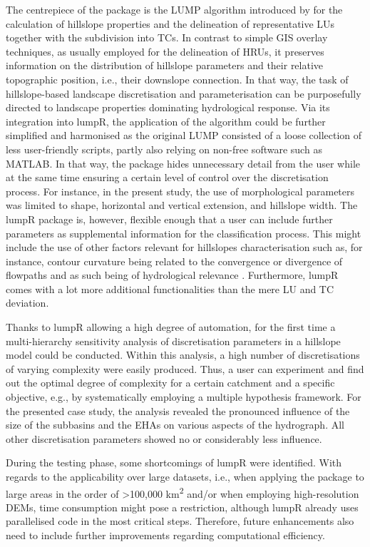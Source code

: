 The centrepiece of the package is the LUMP algorithm introduced by \citet{Francke2008} for the calculation of hillslope properties and the delineation of representative LUs together with the subdivision into TCs.
In contrast to simple GIS overlay techniques, as usually employed for the delineation of HRUs, it preserves information on the distribution of hillslope parameters and their relative topographic position, i.e., their downslope connection.
In that way, the task of hillslope-based landscape discretisation and parameterisation can be purposefully directed to landscape properties dominating hydrological response.
Via its integration into lumpR, the application of the algorithm could be further simplified and harmonised as the original LUMP consisted of a loose collection of less user-friendly scripts, partly also relying on non-free software such as MATLAB.
In that way, the package hides unnecessary detail from the user while at the same time ensuring a certain level of control over the discretisation process.
For instance, in the present study, the use of morphological parameters was limited to shape, horizontal and vertical extension, and hillslope width.
The lumpR package is, however, flexible enough that a user can include further parameters as supplemental information for the classification process.
This might include the use of other factors relevant for hillslopes characterisation such as, for instance, contour curvature being related to the convergence or divergence of flowpaths and as such being of hydrological relevance \citep{Bogaart2006}.
Furthermore, lumpR comes with a lot more additional functionalities than the mere LU and TC deviation.

Thanks to lumpR allowing a high degree of automation, for the first time a multi-hierarchy sensitivity analysis of discretisation parameters in a hillslope model could be conducted.
Within this analysis, a high number of discretisations of varying complexity were easily produced.
Thus, a user can experiment and find out the optimal degree of complexity for a certain catchment and a specific objective, e.g., by systematically employing a multiple hypothesis framework.
For the presented case study, the analysis revealed the pronounced influence of the size of the subbasins and the EHAs on various aspects of the hydrograph.
All other discretisation parameters showed no or considerably less influence.

During the testing phase, some shortcomings of lumpR were identified.
With regards to the applicability over large datasets, i.e., when applying the package to large areas in the order of >100,000 \unit{km^2} and/or when employing high-resolution DEMs, time consumption might pose a restriction, although lumpR already uses parallelised code in the most critical steps.
Therefore, future enhancements also need to include further improvements regarding computational efficiency.

